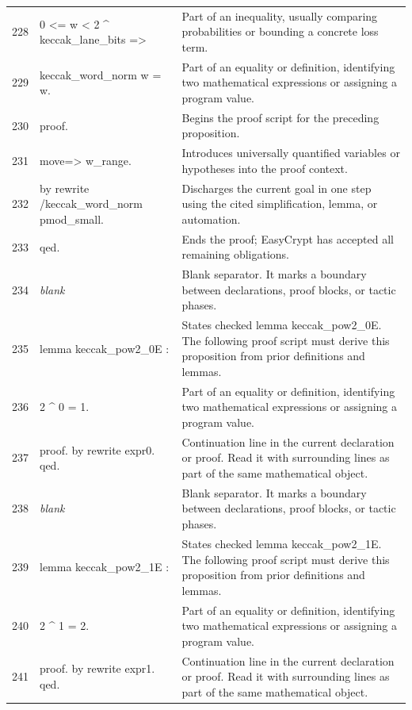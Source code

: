 \documentclass[10pt]{article}
\begin{document}
\begin{longtable}{r L{0.53\textwidth} L{0.37\textwidth}}
228 & {\ttfamily\scriptsize   0 <= w < 2 \textasciicircum{} keccak\_lane\_bits =>} & Part of an inequality, usually comparing probabilities or bounding a concrete loss term. \\
229 & {\ttfamily\scriptsize   keccak\_word\_norm w = w.} & Part of an equality or definition, identifying two mathematical expressions or assigning a program value. \\
230 & {\ttfamily\scriptsize proof.} & Begins the proof script for the preceding proposition. \\
231 & {\ttfamily\scriptsize move=> w\_range.} & Introduces universally quantified variables or hypotheses into the proof context. \\
232 & {\ttfamily\scriptsize by rewrite /keccak\_word\_norm pmod\_small.} & Discharges the current goal in one step using the cited simplification, lemma, or automation. \\
233 & {\ttfamily\scriptsize qed.} & Ends the proof; EasyCrypt has accepted all remaining obligations. \\
234 & {\ttfamily\scriptsize \emph{blank}} & Blank separator.  It marks a boundary between declarations, proof blocks, or tactic phases. \\
235 & {\ttfamily\scriptsize lemma keccak\_pow2\_0E :} & States checked lemma keccak\_pow2\_0E.  The following proof script must derive this proposition from prior definitions and lemmas. \\
236 & {\ttfamily\scriptsize   2 \textasciicircum{} 0 = 1.} & Part of an equality or definition, identifying two mathematical expressions or assigning a program value. \\
237 & {\ttfamily\scriptsize proof. by rewrite expr0. qed.} & Continuation line in the current declaration or proof.  Read it with surrounding lines as part of the same mathematical object. \\
238 & {\ttfamily\scriptsize \emph{blank}} & Blank separator.  It marks a boundary between declarations, proof blocks, or tactic phases. \\
239 & {\ttfamily\scriptsize lemma keccak\_pow2\_1E :} & States checked lemma keccak\_pow2\_1E.  The following proof script must derive this proposition from prior definitions and lemmas. \\
240 & {\ttfamily\scriptsize   2 \textasciicircum{} 1 = 2.} & Part of an equality or definition, identifying two mathematical expressions or assigning a program value. \\
241 & {\ttfamily\scriptsize proof. by rewrite expr1. qed.} & Continuation line in the current declaration or proof.  Read it with surrounding lines as part of the same mathematical object. \\

\end{longtable}
\end{document}
